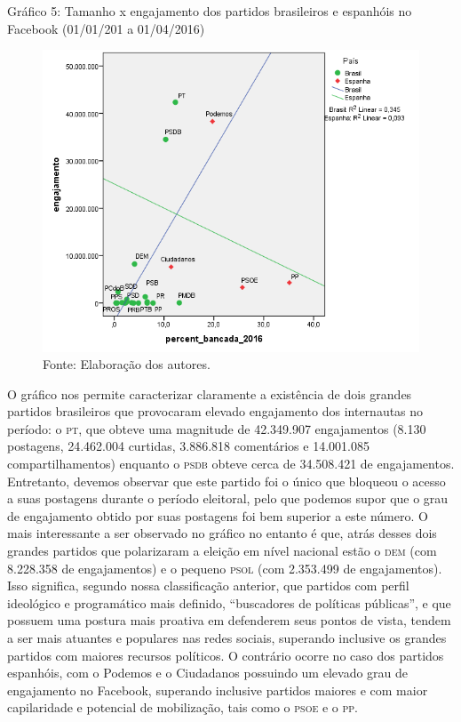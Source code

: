\begin{center}
Gráfico 5: Tamanho x engajamento dos partidos brasileiros e espanhóis no
Facebook (01/01/201 a 01/04/2016) %

\begin{figure}[!ht]
\centering
 \includegraphics[width=\textwidth]{./imgs/graf5.png}
\caption{Fonte: Elaboração dos autores.}
\end{figure}
\end{center}

O gráfico nos permite caracterizar claramente a existência de dois
grandes partidos brasileiros que provocaram elevado engajamento dos
internautas no período: o \textsc{pt}, que obteve uma magnitude de 42.349.907
engajamentos (8.130 postagens, 24.462.004 curtidas, 3.886.818
comentários e 14.001.085 compartilhamentos) enquanto o \textsc{psdb} obteve cerca
de 34.508.421 de engajamentos. Entretanto, devemos observar que este
partido foi o único que bloqueou o acesso a suas postagens durante o
período eleitoral, pelo que podemos supor que o grau de engajamento
obtido por suas postagens foi bem superior a este número. O mais
interessante a ser observado no gráfico no entanto é que, atrás desses
dois grandes partidos que polarizaram a eleição em nível nacional estão
o \textsc{dem} (com 8.228.358 de engajamentos) e o pequeno \textsc{psol} (com 2.353.499 de
engajamentos). Isso significa, segundo nossa classificação anterior, que
partidos com perfil ideológico e programático mais definido,
``buscadores de políticas públicas'', e que possuem uma postura mais
proativa em defenderem seus pontos de vista, tendem a ser mais atuantes
e populares nas redes sociais, superando inclusive os grandes partidos
com maiores recursos políticos. O contrário ocorre no caso dos partidos
espanhóis, com o Podemos e o Ciudadanos possuindo um elevado grau de
engajamento no Facebook, superando inclusive partidos maiores e com
maior capilaridade e potencial de mobilização, tais como o \textsc{psoe} e o \textsc{pp}.

